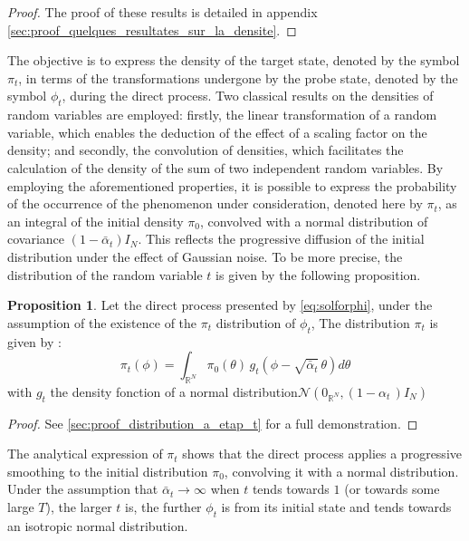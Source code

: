 \documentclass[a4paper,10pt]{article}
\theoremstyle{definition} %
\theoremstyle{definition} %
\newtheorem{proposition}[definition]{Proposition}
\theoremstyle{definition} %
\theoremstyle{definition} %
\newcommand{\R}{\mathbb{R}}
\begin{document}
\begin{proof}
The proof of these results is detailed in appendix \cref{sec:proof_quelques_resultates_sur_la_densite}.
\end{proof}


The objective is to express the density of the target state, denoted by the symbol $\pi_t$, in terms of the transformations undergone by the probe state, denoted by the symbol $\phi_t$, during the direct process. Two classical results on the densities of random variables are employed: firstly, the linear transformation of a random variable, which enables the deduction of the effect of a scaling factor on the density; and secondly, the convolution of densities, which facilitates the calculation of the density of the sum of two independent random variables. By employing the aforementioned properties, it is possible to express the probability of the occurrence of the phenomenon under consideration, denoted here by $\pi_t$, as an integral of the initial density $\pi_0$, convolved with a normal distribution of covariance \((1 - \bar{\alpha}_t) I_N\). This reflects the progressive diffusion of the initial distribution under the effect of Gaussian noise. To be more precise, the distribution of the random variable $t$ is given by the following proposition.
\begin{proposition}\label{prop:distribution_a_etap_t}
    Let the direct process presented by \cref{eq:solforphi}, under the assumption of the existence of the $\pi_t$ distribution of $\phi_t$, The distribution $\pi_t$ is given by :    \begin{equation}\label{eq:distribution_pi_t}
        \pi_t(\phi) = \int_{\R^N} \pi_0(\theta)\, g_t(\phi - \sqrt{\bar \alpha_t}\,\theta) d\theta
    \end{equation}
    with $g_t$ the density fonction of a normal distribution$\mathcal{N}\left(0_{\R^N}, (1- \alpha _t \,)I_N\right)$
\end{proposition}

\begin{proof}
    See \cref{sec:proof_distribution_a_etap_t} for a full demonstration.
\end{proof}


The analytical expression of $\pi_t$ shows that the direct process applies a progressive smoothing to the initial distribution $\pi_0$, convolving it with a normal distribution. Under the assumption that $\bar \alpha_t \rightarrow \infty$ when $t$ tends towards $1$ (or towards some large $T$), the larger $t$ is, the further $\phi_t$ is from its initial state and tends towards an isotropic normal distribution.
\end{document}
